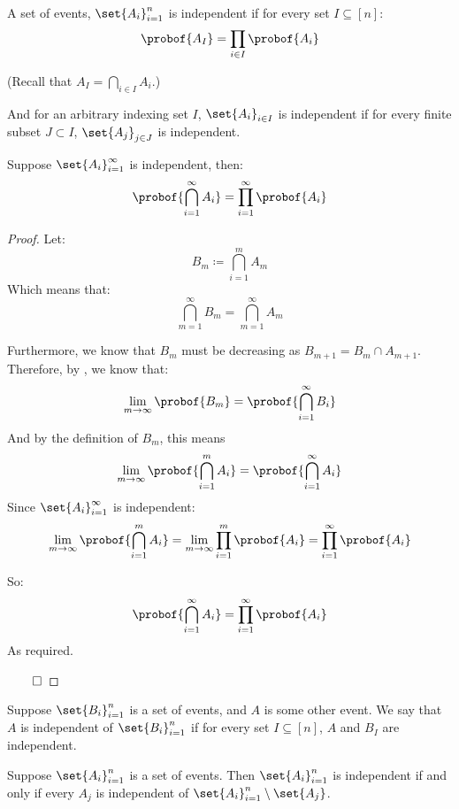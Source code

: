 \begin{defn*}

	A set of events, $\set{A_i}_{i=1}^n$ is independent if for every set $I\subseteq[n]$:
	\[ \probof{A_I} = \prod_{i\in I}\probof{A_i} \]

	(Recall that $A_I=\bigcap\limits_{i\in I}A_i$.)

	And for an arbitrary indexing set $I$, $\set{A_i}_{i\in I}$ is independent if for every finite subset $J\subset I$,
	$\set{A_j}_{j\in J}$ is independent.

\end{defn*}

\begin{prop*}

	Suppose $\set{A_i}_{i=1}^\infty$ is independent, then:
	\[ \probof{\bigcap_{i=1}^\infty A_i} = \prod_{i=1}^\infty\probof{A_i} \]

\end{prop*}

\begin{proof}

	Let:
	\[ B_m\coloneqq\bigcap_{i=1}^m A_m \]
	Which means that:
	\[ \bigcap_{m=1}^\infty B_m = \bigcap_{m=1}^\infty A_m \]

	Furthermore, we know that $B_m$ must be decreasing as $B_{m+1}=B_m\cap A_{m+1}$.
	Therefore, by , we know that:
	\[ \lim_{m\to\infty}\probof{B_m} = \probof{\bigcap_{i=1}^\infty B_i} \]
	And by the definition of $B_m$, this means
	\[ \lim_{m\to\infty}\probof{\bigcap_{i=1}^m A_i} = \probof{\bigcap_{i=1}^\infty A_i} \]
	Since $\set{A_i}_{i=1}^\infty$ is independent:
	\[ \lim_{m\to\infty}\probof{\bigcap_{i=1}^m A_i} = \lim_{m\to\infty}\prod_{i=1}^m \probof{A_i} =
	   \prod_{i=1}^\infty\probof{A_i} \]
	
	So:
	\[ \probof{\bigcap_{i=1}^\infty A_i} = \prod_{i=1}^\infty\probof{A_i} \]
	As required.

\hfill$\qed$

\end{proof}

\begin{defn*}

	Suppose $\set{B_i}_{i=1}^n$ is a set of events, and $A$ is some other event.
	We say that $A$ is independent of $\set{B_i}_{i=1}^n$ if for every set $I\subseteq[n]$, $A$ and $B_I$ are independent.

\end{defn*}

\begin{prop*}

	Suppose $\set{A_i}_{i=1}^n$ is a set of events.
	Then $\set{A_i}_{i=1}^n$ is independent if and only if every $A_j$ is independent of 
	$\set{A_i}_{i=1}^n\setminus\set{A_j}$.

\end{prop*}

